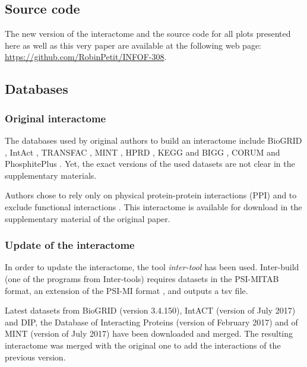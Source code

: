 \documentclass[letterpaper]{article}
\begin{document}
	\subsection{Source code}
	The new version of the interactome and the source code for all plots presented here as well as this
	very paper are available at the following web page: \url{https://github.com/RobinPetit/INFOF-308}.

	\subsection{Databases}
		\subsubsection{Original interactome}
		The databases used by original authors to build an interactome include BioGRID \citep{chatr2017biogrid},
		IntAct \citep{kerrien2011intact}, TRANSFAC \citep{matys2003transfac}, MINT \citep{licata2011mint}, HPRD
		\citep{keshava2008HPRD}, KEGG and BIGG \citep{lee2008KEGG-BIGG}, CORUM \citep{ruepp2009corum} and
		PhosphitePlus \citep{hornbeck2011phosphositeplus}. Yet, the exact versions of the used datasets are not
		clear in the supplementary materials.

		Authors chose to rely only on physical protein-protein interactions (PPI) and to exclude functional
		interactions \citep{caldera2017interactome}. This interactome is available for download in the
		supplementary material of the original paper.

		\subsubsection{Update of the interactome}
		In order to update the interactome, the tool \textit{inter-tool} \citep{inter-tools} has been used.
		Inter-build (one of the programs from Inter-tools) requires datasets in the PSI-MITAB format, an extension of the
		PSI-MI format \citep{MITABFormat}, and outputs a tsv file.


		Latest datasets from BioGRID (version 3.4.150), IntACT (version of July 2017) and DIP, the Database of
		Interacting Proteins (version of February 2017) \citep{salwinski2004DIP} and of MINT (version of July
		2017) have been downloaded and merged. The resulting interactome was merged with the original one to
		add the interactions of the previous version.
\end{document}
